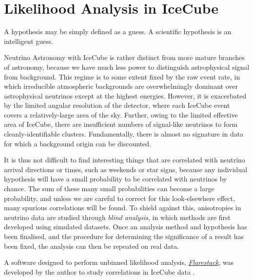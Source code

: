 \setchapterpreamble[u]{\margintoc}
\chapter{Likelihood Analysis in IceCube}
\begin{fquote} A hypothesis may be simply defined as a guess. A scientific hypothesis is an intelligent guess. 
\end{fquote}
Neutrino Astronomy with IceCube is rather distinct from more mature branches of astronomy, because we have much less power to distinguish astrophysical signal from background. This regime is to some extent fixed by the raw event rate, in which irreducible atmospheric backgrounds are overwhelmingly dominant over astrophysical neutrinos except at the highest energies. However, it is exacerbated by the limited angular resolution of the detector, where each IceCube event covers a relatively-large area of the sky. Further, owing to the limited effective area of IceCube, there are insufficient numbers of signal-like neutrinos to form cleanly-identifiable clusters. Fundamentally, there is almost no signature in data for which a background origin can be discounted.

It is thus not difficult to find interesting things that are correlated with neutrino arrival directions or times, such as weekends or star signs, because any individual hypothesis will have a small probability to be correlated with  neutrinos by chance. The sum of these many small probabilities can become a large probability, and unless we are careful to correct for this look-elsewhere effect, many spurious correlations will be found. To shield against this, anisotropies in neutrino data are studied through \emph{blind analysis}, in which methods are first developed using simulated datasets. Once an analysis method and hypothesis has been finalised, and the procedure for determining the significance of a result has been fixed, the analysis can then be repeated on real data.

A software designed to perform unbinned likelihood analysis, \emph{\href{https://github.com/IceCubeOpenSource/flarestack}{Flarestack}}, was developed by the author to study correlations in IceCube data .

